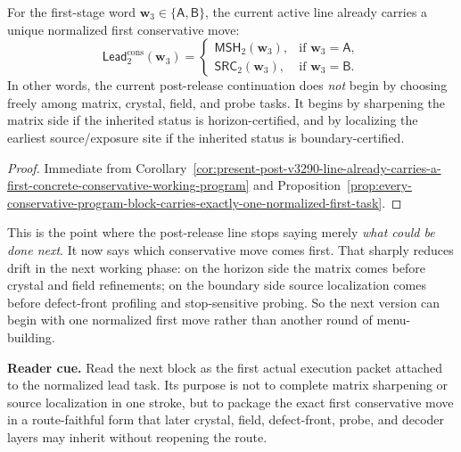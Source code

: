 \begin{corollary}
\label{cor:present-post-v3290-line-already-carries-a-unique-first-conservative-move}
For the first-stage word \(\mathbf w_3\in\{\mathsf A,\mathsf B\}\), the current active line already carries a unique normalized first conservative move:
\[
  \mathsf{Lead}^{\mathrm{cons}}_{2}(\mathbf w_3)
  =
  \begin{cases}
    \mathsf{MSH}_{2}(\mathbf w_3), & \text{if }\mathbf w_3=\mathsf A,\\[2mm]
    \mathsf{SRC}_{2}(\mathbf w_3), & \text{if }\mathbf w_3=\mathsf B.
  \end{cases}
\]
In other words, the current post-release continuation does \emph{not} begin by choosing freely among matrix, crystal, field, and probe tasks. It begins by sharpening the matrix side if the inherited status is horizon-certified, and by localizing the earliest source/exposure site if the inherited status is boundary-certified.
\end{corollary}

\begin{proof}
Immediate from Corollary~\ref{cor:present-post-v3290-line-already-carries-a-first-concrete-conservative-working-program} and Proposition~\ref{prop:every-conservative-program-block-carries-exactly-one-normalized-first-task}.
\end{proof}

\begin{remark}
\label{rem:what-the-lead-task-extraction-now-buys}
This is the point where the post-release line stops saying merely \emph{what could be done next}. It now says which conservative move comes first. That sharply reduces drift in the next working phase: on the horizon side the matrix comes before crystal and field refinements; on the boundary side source localization comes before defect-front profiling and stop-sensitive probing. So the next version can begin with one normalized first move rather than another round of menu-building.
\end{remark}



\noindent\textbf{Reader cue.} Read the next block as the first actual execution packet attached to the normalized lead task. Its purpose is not to complete matrix sharpening or source localization in one stroke, but to package the exact first conservative move in a route-faithful form that later crystal, field, defect-front, probe, and decoder layers may inherit without reopening the route.

